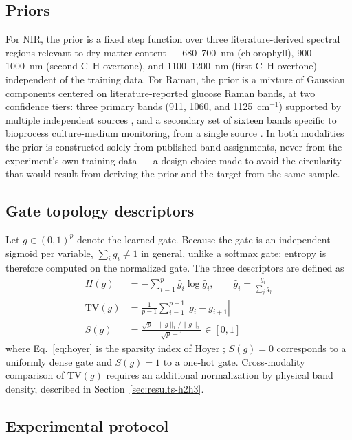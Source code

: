 \documentclass[preprint,12pt]{elsarticle}
\providecommand{\DIFaddbegin}{} %
\providecommand{\DIFaddend}{} %
\providecommand{\DIFaddincludegraphics}[2][]{{\color{blue}\fbox{\DIFOincludegraphics[#1]{#2}}}} %
\DeclareRobustCommand{\DIFaddbegin}{\DIFOaddbegin \let\includegraphics\DIFaddincludegraphics} %
\DeclareRobustCommand{\DIFaddend}{\DIFOaddend \let\includegraphics\DIFOincludegraphics} %
\begin{document}
\subsection{Priors}
\DIFaddbegin \label{sec:priors}
\DIFaddend 

For NIR, the prior is a fixed step function over three literature-derived spectral regions relevant to dry matter content --- 680--700~nm (chlorophyll), 900--1000~nm (second C--H overtone), and 1100--1200~nm (first C--H overtone) \cite{saranwong2004} --- independent of the training data. For Raman, the prior is a mixture of Gaussian components centered on literature-reported glucose Raman bands, at two confidence tiers: three primary bands (911, 1060, and 1125~cm$^{-1}$) supported by multiple independent sources \cite{lyu2012,kang2020}, and a secondary set of sixteen bands specific to bioprocess culture-medium monitoring, from a single source \cite{uspatent2024}. In both modalities the prior is constructed solely from published band assignments, never from the experiment's own training data --- a design choice made to avoid the circularity that would result from deriving the prior and the target from the same sample.

\subsection{Gate topology descriptors}
\label{sec:topology}

Let $g\in(0,1)^{p}$ denote the learned gate. Because the gate is an independent sigmoid per variable, $\sum_i g_i \neq 1$ in general, unlike a softmax gate; entropy is therefore computed on the normalized gate. The three descriptors are defined as
\begin{align}
H(g) &= -\sum_{i=1}^{p} \hat g_i \log \hat g_i, \qquad \hat g_i = \frac{g_i}{\sum_j g_j} \label{eq:entropy}\\
\mathrm{TV}(g) &= \frac{1}{p-1}\sum_{i=1}^{p-1} |g_i - g_{i+1}| \label{eq:tv}\\
S(g) &= \frac{\sqrt{p}-\|g\|_1/\|g\|_2}{\sqrt{p}-1} \in [0,1] \label{eq:hoyer}
\end{align}
where Eq.~\eqref{eq:hoyer} is the sparsity index of Hoyer \cite{hoyer2004}; $S(g)=0$ corresponds to a uniformly dense gate and $S(g)=1$ to a one-hot gate. Cross-modality comparison of $\mathrm{TV}(g)$ requires an additional normalization by physical band density, described in Section~\ref{sec:results-h2h3}.

\subsection{Experimental protocol}
\end{document}
